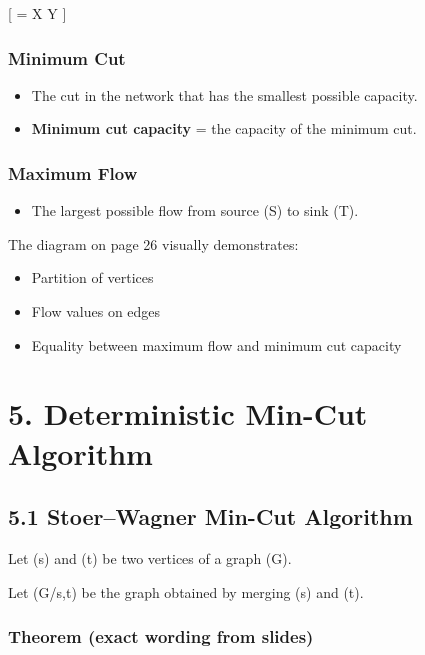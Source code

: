 \documentclass[12pt]{article}
\begin{document}
[
 = \sum {} \in X  \in Y
]

\bigskip

\subsubsection*{Minimum Cut}

\begin{itemize}
\item The cut in the network that has the smallest possible capacity.
\item \textbf{Minimum cut capacity} = the capacity of the minimum cut.
\end{itemize}

\bigskip

\subsubsection*{Maximum Flow}

\begin{itemize}
\item The largest possible flow from source (S) to sink (T).
\end{itemize}

The diagram on page 26 visually demonstrates:

\begin{itemize}
\item Partition of vertices
\item Flow values on edges
\item Equality between maximum flow and minimum cut capacity
\end{itemize}

\bigskip

\section*{5. Deterministic Min-Cut Algorithm}

\subsection*{5.1 Stoer–Wagner Min-Cut Algorithm}

Let (s) and (t) be two vertices of a graph (G).

Let (G/{s,t}) be the graph obtained by merging (s) and (t).

\subsubsection*{Theorem (exact wording from slides)}
\end{document}
